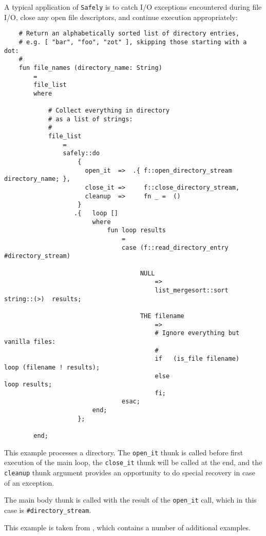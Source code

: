 
A typical application of {\tt Safely} is to catch {\sc I/O} exceptions encountered 
during file {\sc I/O}, close any open file descriptors, and continue execution 
appropriately:

\begin{verbatim}
    # Return an alphabetically sorted list of directory entries,
    # e.g. [ "bar", "foo", "zot" ], skipping those starting with a dot:
    #
    fun file_names (directory_name: String)
        =
        file_list
        where

            # Collect everything in directory
            # as a list of strings:
            #
            file_list
                =
                safely::do
                    {
                      open_it  =>  .{ f::open_directory_stream  directory_name; },
                      close_it =>     f::close_directory_stream,
                      cleanup  =>     fn _ =  ()
                    }
                   .{   loop []
                        where
                            fun loop results
                                =
                                case (f::read_directory_entry  #directory_stream)
                                  
                                     NULL
                                         =>
                                         list_mergesort::sort  string::(>)  results;

                                     THE filename
                                         =>
                                         # Ignore everything but vanilla files:
                                         #
                                         if   (is_file filename)   loop (filename ! results);
                                         else                      loop results;
                                         fi;
                                esac;
                        end;
                    };

        end;
\end{verbatim}

This example processes a directory.  The {\tt open\_it} thunk is called before first execution 
of the main loop, the {\tt close\_it} thunk will be called at the end, and the {\tt cleanup} 
thunk argument provides an opportunity to do special recovery in case of an exception.

The main body thunk is called with the result of the {\tt open\_it} call, which in this case 
is {\tt #directory\_stream}.

This example is taken from , which 
contains a number of additional examples.


